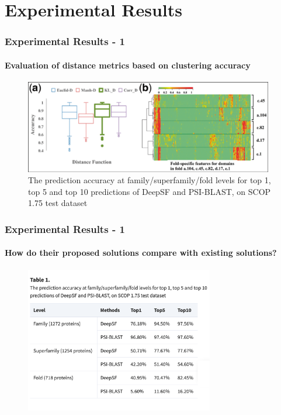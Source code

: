 \documentclass[xcolor={usenames,dvipsnames},hyperref={hyperindex,bookmarks}]{beamer}
\begin{document}

\section{Experimental Results}



\frame
{
	\frametitle{Experimental Results - 1}
	\framesubtitle{Evaluation of distance metrics based on clustering accuracy}


	\begin{figure}[h]
	\centering 
	\includegraphics[height=1.6in]{./pics/distance-metrics}
	\caption{The prediction accuracy at family/superfamily/fold levels for top 1, top 5 and top 10 predictions of DeepSF and PSI-BLAST, on SCOP 1.75 test dataset}
	\label{fig:distancemetrics}
	\end{figure}
}








\frame
{
	\frametitle{Experimental Results - 1}
	\framesubtitle{How do their proposed solutions compare with existing solutions?}


	\begin{figure}[h]
	\centering 
	\includegraphics[height=2.5in]{./pics/table-1}
	\label{fig:Table1}
	\end{figure}
}
\end{document}
